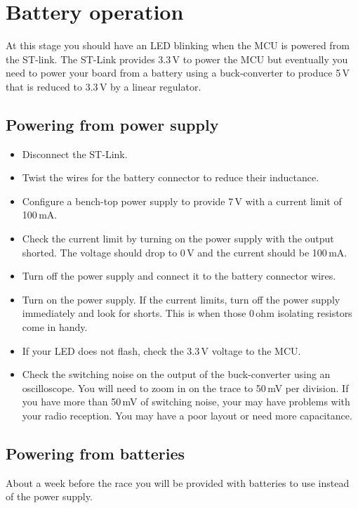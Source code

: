 \chapter{Battery operation}
\label{battery-operation}

At this stage you should have an LED blinking when the MCU is powered
from the ST-link.  The ST-Link provides 3.3\,V to power the MCU but
eventually you need to power your board from a battery using a
buck-converter to produce 5\,V that is reduced to 3.3\,V by a linear
regulator.


\section{Powering from power supply}

\begin{itemize}
\item Disconnect the ST-Link.

\item Twist the wires for the battery connector to reduce their
  inductance.

\item Configure a bench-top power supply to provide 7\,V with a
  current limit of 100\,mA.

\item Check the current limit by turning on the power supply with the
  output shorted.  The voltage should drop to 0\,V and the current
  should be 100\,mA.

\item Turn off the power supply and connect it to the battery
  connector wires.

\item Turn on the power supply.  If the current limits, turn off the
  power supply immediately and look for shorts.  This is when those
  0\,ohm isolating resistors come in handy.

\item If your LED does not flash, check the 3.3\,V voltage to the MCU.

\item Check the switching noise on the output of the buck-converter
  using an oscilloscope.  You will need to zoom in on the trace to
  50\,mV per division.  If you have more than 50\,mV of switching
  noise, your may have problems with your radio reception.  You may
  have a poor layout or need more capacitance.

\end{itemize}


\section{Powering from batteries}

About a week before the race you will be provided with batteries to
use instead of the power supply.
